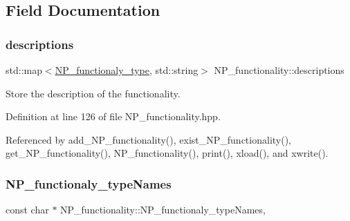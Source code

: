\subsection{Field Documentation}
\mbox{\label{classNP__functionality_a55a88b3aedde2d4c7c569f9a9f68047b}} 
\subsubsection{\texorpdfstring{descriptions}{descriptions}}
{\footnotesize\ttfamily std\+::map$<$\hyperlink{classNP__functionality_a318d6f254060bfdf145ebeb41efe772e}{N\+P\+\_\+functionaly\+\_\+type}, std\+::string$>$ N\+P\+\_\+functionality\+::descriptions\hspace{0.3cm}{\ttfamily [private]}}



Store the description of the functionality. 



Definition at line 126 of file N\+P\+\_\+functionality.\+hpp.



Referenced by add\+\_\+\+N\+P\+\_\+functionality(), exist\+\_\+\+N\+P\+\_\+functionality(), get\+\_\+\+N\+P\+\_\+functionality(), N\+P\+\_\+functionality(), print(), xload(), and xwrite().

\mbox{\label{classNP__functionality_a742cf4b8ee952fdaee3b157f9313820c}} 
\subsubsection{\texorpdfstring{N\+P\+\_\+functionaly\+\_\+type\+Names}{NP\_functionaly\_typeNames}}
{\footnotesize\ttfamily const char $\ast$ N\+P\+\_\+functionality\+::\+N\+P\+\_\+functionaly\+\_\+type\+Names\hspace{0.3cm}{\ttfamily [static]}, {\ttfamily [private]}}

